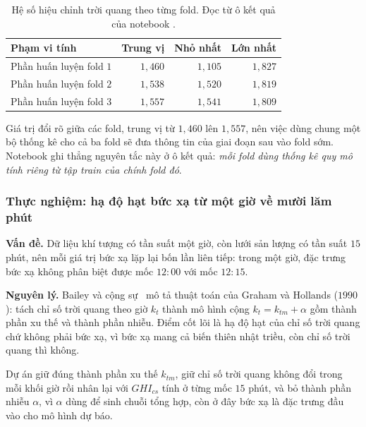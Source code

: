 \begin{table}[htbp]
\centering

\small
\begin{tabular}{l r r r}
\toprule
\textbf{Phạm vi tính} & \textbf{Trung vị} & \textbf{Nhỏ nhất} & \textbf{Lớn nhất} \\
\midrule
Phần huấn luyện fold $1$ & $1{,}460$ & $1{,}105$ & $1{,}827$ \\
Phần huấn luyện fold $2$ & $1{,}538$ & $1{,}520$ & $1{,}819$ \\
Phần huấn luyện fold $3$ & $1{,}557$ & $1{,}541$ & $1{,}809$ \\
\bottomrule
\end{tabular}
\caption[Hệ số hiệu chỉnh trời quang  theo từng fold]{Hệ số hiệu chỉnh trời quang  theo từng fold. Đọc từ ô kết quả của
notebook .}
\label{tab:cs_factor}
\end{table}

Giá trị đổi rõ giữa các fold, trung vị từ $1{,}460$ lên $1{,}557$, nên việc dùng chung
một bộ thống kê cho cả ba fold sẽ đưa thông tin của giai đoạn sau vào fold sớm. Notebook ghi
thẳng nguyên tắc này ở ô kết quả: \textit{mỗi fold dùng thống kê quy mô tính riêng từ tập
train của chính fold đó}.

\subsubsection{Thực nghiệm: hạ độ hạt bức xạ từ một giờ về mười lăm phút}

\textbf{Vấn đề.} Dữ liệu khí tượng có tần suất một giờ, còn lưới sản lượng có tần suất $15$
phút, nên mỗi giá trị bức xạ lặp lại bốn lần liên tiếp: trong một giờ, đặc trưng bức xạ không
phân biệt được mốc $12{:}00$ với mốc $12{:}15$.

\textbf{Nguyên lý.} Bailey và cộng sự~\cite{bailey2024} mô tả thuật toán của Graham và
Hollands ($1990$): tách chỉ số trời quang theo giờ $k_t$ thành mô hình cộng
$k_t = k_{tm} + \alpha$ gồm thành phần xu thế và thành phần nhiễu. Điểm cốt lõi là hạ độ hạt của chỉ số trời quang chứ không phải bức xạ, vì bức xạ mang cả biến thiên nhật
triều, còn chỉ số trời quang thì không.

Dự án giữ đúng thành phần xu thế $k_{tm}$, giữ chỉ số trời quang không đổi trong mỗi khối
giờ rồi nhân lại với $GHI_{cs}$ tính ở từng mốc $15$ phút, và bỏ thành phần nhiễu $\alpha$,
vì $\alpha$ dùng để sinh chuỗi tổng hợp, còn ở đây bức xạ là đặc trưng đầu vào cho mô hình
dự báo.

